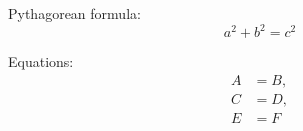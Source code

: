 

Pythagorean formula:
\[
a^2 + b^2 = c^2
\]

Equations:
\[
\begin{align*}
A&=B,\\
C&=D,\\
E&=F
\end{align*}
\]


